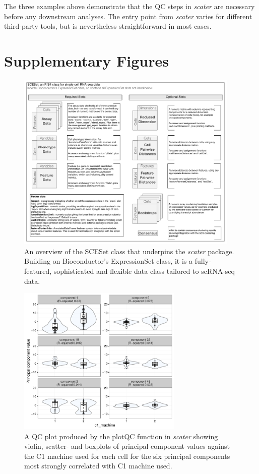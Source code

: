 \documentclass[10pt,letterpaper]{article}
\begin{document}
The three examples above demonstrate that the QC steps in \emph{scater} are necessary before any downstream analyses. The entry point from \emph{scater} varies for different third-party tools, but is nevertheless straightforward in most cases.


\section*{Supplementary Figures}


\begin{figure}[!htpb]%
\centerline{\includegraphics[width=0.95\textwidth]{figures/sceset_outline.pdf}}
\caption{An overview of the SCESet class that underpins the \emph{scater} package. Building on Bioconductor's ExpressionSet class, it is a fully-featured, sophisticated and flexible data class tailored to scRNA-seq data.}\label{fig:02}
\end{figure}


\begin{figure}[!tpb]
\centerline{\includegraphics[width=0.7\textwidth]{figures/find-pcs_c1_machine.pdf}}
\caption{A QC plot produced by the plotQC function in \emph{scater} showing violin, scatter- and boxplots of principal component values against the C1 machine used for each cell for the six principal components most strongly correlated with C1 machine used.}\label{fig:plotqc-c1-machine}
\end{figure}
\end{document}
